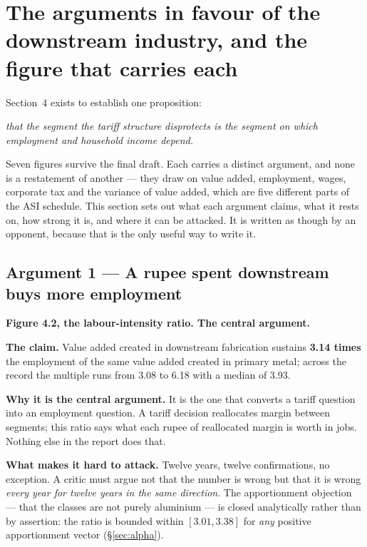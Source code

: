 \documentclass[11pt, a4paper]{article}
\begin{document}
\section{The arguments in favour of the downstream industry, and the figure that carries each}

Section~4 exists to establish one proposition:

\begin{center}
\itshape that the segment the tariff structure disprotects is the segment on which
employment and household income depend.
\end{center}

\noindent Seven figures survive the final draft. Each carries a distinct argument, and
none is a restatement of another --- they draw on value added, employment, wages,
corporate tax and the variance of value added, which are five different parts of the
ASI schedule. This section sets out what each argument claims, what it rests on, how
strong it is, and where it can be attacked. It is written as though by an opponent,
because that is the only useful way to write it.

\subsection{Argument 1 --- A rupee spent downstream buys more employment}
\textbf{Figure 4.2, the labour-intensity ratio. The central argument.}

\textbf{The claim.} Value added created in downstream fabrication sustains
\textbf{3.14 times} the employment of the same value added created in primary metal;
across the record the multiple runs from 3.08 to 6.18 with a median of 3.93.

\textbf{Why it is the central argument.} It is the one that converts a tariff question
into an employment question. A tariff decision reallocates margin between segments;
this ratio says what each rupee of reallocated margin is worth in jobs. Nothing else
in the report does that.

\textbf{What makes it hard to attack.} Twelve years, twelve confirmations, no
exception. A critic must argue not that the number is wrong but that it is wrong
\emph{every year for twelve years in the same direction}. The apportionment objection
--- that the classes are not purely aluminium --- is closed analytically rather than by
assertion: the ratio is bounded within $[3.01, 3.38]$ for \emph{any} positive
apportionment vector (§\ref{sec:alpha}).
\end{document}
